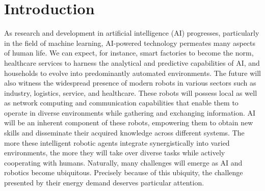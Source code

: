 \documentclass[12pt]{article}
\begin{document}
\section*{Introduction}\label{sec:intro}
As research and development in artificial intelligence (AI) progresses, particularly in the field of machine learning, AI-powered technology permeates many aspects of human life. We can expect, for instance, smart factories to become the norm, healthcare services to harness the analytical and predictive capabilities of AI, and households to evolve into predominantly automated environments. The future will also witness the widespread presence of modern robots in various sectors such as industry, logistics, service, and healthcare. These robots will possess local as well as network computing and communication capabilities that enable them to operate in diverse environments while gathering and exchanging information. AI will be an inherent component of these robots, empowering them to obtain new skills and disseminate their acquired knowledge across different systems. The more these intelligent robotic agents integrate synergistically into varied environments, the more they will take over diverse tasks while actively cooperating with humans. Naturally, many challenges will emerge as AI and robotics become ubiquitous. Precisely because of this ubiquity, the challenge presented by their energy demand deserves particular attention.
\end{document}
